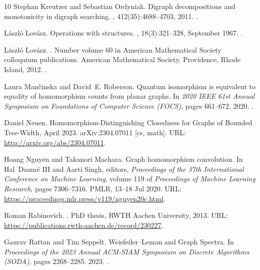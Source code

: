 \documentclass[a4paper,UKenglish,cleveref, autoref, thm-restate]{lipics-v2021}
\begin{document}
\begin{thebibliography}{10}
Stephan Kreutzer and Sebastian Ordyniak.
\newblock Digraph decompositions and monotonicity in digraph searching.
, 412(35):4688--4703, 2011.
\newblock \href {https://doi.org/10.1016/j.tcs.2011.05.003}
  {}.

L{\'a}szl{\'o} Lov{\'a}sz.
\newblock Operations with structures.
,
  18(3):321--328, September 1967.
\newblock \href {https://doi.org/10.1007/BF02280291}
  {}.

László Lovász.
.
\newblock Number volume 60 in American {Mathematical} {Society} colloquium
  publications. American Mathematical Society, Providence, Rhode Island, 2012.
\newblock \href {https://doi.org/10.1090/coll/060}
  {}.

Laura Man{\v c}inska and David~E. Roberson.
\newblock Quantum isomorphism is equivalent to equality of homomorphism counts
  from planar graphs.
\newblock In {\em 2020 {IEEE} 61st {Annual} {Symposium} on {Foundations} of
  {Computer} {Science} ({FOCS})}, pages 661--672, 2020.
\newblock \href {https://doi.org/10.1109/FOCS46700.2020.00067}
  {}.

Daniel Neuen.
\newblock Homomorphism-{Distinguishing} {Closedness} for {Graphs} of {Bounded}
  {Tree}-{Width}, April 2023.
\newblock arXiv:2304.07011 [cs, math].
\newblock URL: \url{http://arxiv.org/abs/2304.07011}.

Hoang Nguyen and Takanori Maehara.
\newblock Graph homomorphism convolution.
\newblock In Hal~Daumé III and Aarti Singh, editors, {\em Proceedings of the
  37th International Conference on Machine Learning}, volume 119 of {\em
  Proceedings of Machine Learning Research}, pages 7306--7316. PMLR, 13--18 Jul
  2020.
\newblock URL: \url{https://proceedings.mlr.press/v119/nguyen20c.html}.

Roman Rabinovich.
.
\newblock PhD thesis, {RWTH} Aachen University, 2013.
\newblock URL: \url{https://publications.rwth-aachen.de/record/230227}.

Gaurav Rattan and Tim Seppelt.
\newblock Weisfeiler--{Leman} and {Graph} {Spectra}.
\newblock In {\em Proceedings of the 2023 {Annual} {ACM}-{SIAM} {Symposium} on
  {Discrete} {Algorithms} ({SODA})}, pages 2268--2285. 2023.
\newblock \href {https://doi.org/10.1137/1.9781611977554.ch87}
  {}.


\end{thebibliography}
\end{document}
